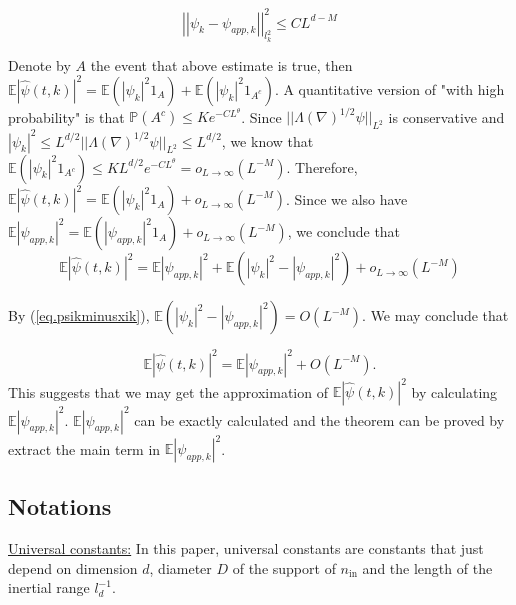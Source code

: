 \begin{equation}\label{eq.psikminusxik}
    \left|\left|\psi_k-\psi_{app,k}\right|\right|^2_{l^2_k}\le CL^{d-M}
\end{equation}


Denote by $A$ the event that above estimate is true, then $\mathbb E |\widehat \psi(t, k)|^2=\mathbb E (|\psi_k|^2 1_{A})+\mathbb E (|\psi_k|^2 1_{A^c})$. A quantitative version of "with high probability" is that $\mathbb P(A^c) \le Ke^{-CL^{\theta}}$. Since $||\Lambda(\nabla)^{1/2} \psi||_{L^2}$ is conservative and $|\psi_k|^2\le L^{d/2} ||\Lambda(\nabla)^{1/2} \psi||_{L^2}\le L^{d/2}$, we know that $\mathbb E (|\psi_k|^2 1_{A^c})\le KL^{d/2} e^{-CL^{\theta}}= o_{L\rightarrow\infty}(L^{-M})$. Therefore, $\mathbb E |\widehat \psi(t, k)|^2=\mathbb E (|\psi_k|^2 1_{A})+o_{L\rightarrow\infty}(L^{-M})$. Since we also have $\mathbb E |\psi_{app,k}|^2=\mathbb E (|\psi_{app,k}|^2 1_{A})+o_{L\rightarrow\infty}(L^{-M})$, we conclude that
\begin{equation}
    \mathbb E |\widehat \psi(t, k)|^2=\mathbb E |\psi_{app,k}|^2+\mathbb E (|\psi_k|^2-|\psi_{app,k}|^2)+o_{L\rightarrow\infty}(L^{-M})
\end{equation}

By (\ref{eq.psikminusxik}), $\mathbb E (|\psi_k|^2-|\psi_{app,k}|^2)=O(L^{-M})$. We may conclude that 

\begin{equation}
    \mathbb E |\widehat \psi(t, k)|^2=\mathbb E |\psi_{app,k}|^2+O(L^{-M}).
\end{equation}
This suggests that we may get the approximation of $\mathbb E |\widehat \psi(t, k)|^2$ by calculating $\mathbb E |\psi_{app,k}|^2$. $\mathbb E |\psi_{app,k}|^2$ can be exactly calculated and the theorem can be proved by extract the main term in $\mathbb E |\psi_{app,k}|^2$. 

 
\subsection{Notations}\label{sec.notat} 

\underline{Universal constants:} In this paper, universal constants are constants that just depend on dimension $d$, diameter $D$ of the support of $n_{\text{in}}$ and the length of the inertial range $l^{-1}_d$. 

